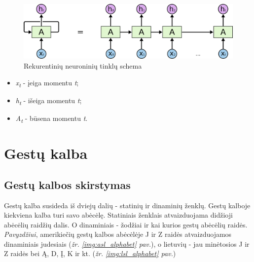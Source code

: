 \documentclass{VUMIFInfKursinis}
\begin{document}
\begin{figure}[H]
	\centering
	\includegraphics[width=.8\linewidth]{img/rnn}
	\caption[]{Rekurentinių neuroninių tinklų schema\footnotemark}
	\label{img:rnn}
\end{figure}
\begin{itemize}
	\item \textit{x\textsubscript{t}} - įeiga momentu \textit{t};
	\item \textit{h\textsubscript{t}} - išeiga momentu \textit{t};
	\item \textit{A\textsubscript{t}} - būsena momentu \textit{t}.
\end{itemize}


\section{Gestų kalba}
\subsection{Gestų kalbos skirstymas}
Gestų kalba susideda iš dviejų dalių - statinių ir dinaminių ženklų. Gestų kalboje kiekviena kalba turi savo abėcėlę. Statiniais ženklais atvaizduojama didžioji abėcėlių raidžių dalis. O dinaminiais - žodžiai ir kai kurios gestų abėcėlių raidės. \textit{Pavyzdžiui}, amerikiečių gestų kalbos abėcėlėje J ir Z raidės atvaizduojamos dinaminiais judesiais (\textit{žr. \ref{img:asl_alphabet} pav.}), o lietuvių - jau minėtosios J ir Z raidės bei Ą, D, Į, K ir kt. (\textit{žr. \ref{img:lsl_alphabet} pav.})
\end{document}
